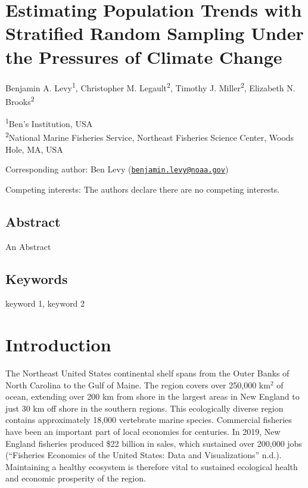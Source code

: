 \documentclass[
  12pt,
]{article}
\author{}
\date{\vspace{-2.5em}}
\begin{document}
\newpage

\hypertarget{estimating-population-trends-with-stratified-random-sampling-under-the-pressures-of-climate-change}{%
\section{Estimating Population Trends with Stratified Random Sampling Under the Pressures of Climate Change}\label{estimating-population-trends-with-stratified-random-sampling-under-the-pressures-of-climate-change}}

Benjamin A. Levy\textsuperscript{1}, Christopher M. Legault\textsuperscript{2}, Timothy J. Miller\textsuperscript{2}, Elizabeth N. Brooks\textsuperscript{2}

\textsuperscript{1}Ben's Institution, USA\\
\textsuperscript{2}National Marine Fisheries Service, Northeast Fisheries Science Center, Woods Hole, MA, USA

Corresponding author: Ben Levy (\href{mailto:benjamin.levy@noaa.gov}{\nolinkurl{benjamin.levy@noaa.gov}})

Competing interests: The authors declare there are no competing interests.

\newpage

\hypertarget{abstract}{%
\subsection{Abstract}\label{abstract}}

An Abstract

\hypertarget{keywords}{%
\subsection{Keywords}\label{keywords}}

keyword 1, keyword 2

\newpage

\section{Introduction}

The Northeast United States continental shelf spans from the Outer Banks of North Carolina to the Gulf of Maine. The region covers over 250,000 km\(^2\) of ocean, extending over 200 km from shore in the largest areas in New England to just 30 km off shore in the southern regions. This ecologically diverse region contains approximately 18,000 vertebrate marine species. Commercial fisheries have been an important part of local economies for centuries. In 2019, New England fisheries produced \$22 billion in sales, which sustained over 200,000 jobs ({``{Fisheries Economics of the United States: Data and Visualizations}''} n.d.). Maintaining a healthy ecosystem is therefore vital to sustained ecological health and economic prosperity of the region.
\end{document}
